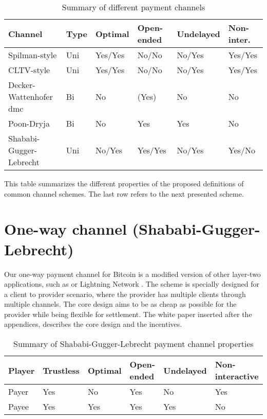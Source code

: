 \documentclass{llncs}
\begin{document}
\begin{table}[h]
  \begin{tabularx}{\textwidth}{ | X | l | l | l | l | l |}
  \hline
  Channel & Type & Optimal & Open-ended & Undelayed & Non-inter. \\
  \hline \hline
  Spilman-style & Uni & Yes/Yes & No/No & No/Yes & Yes/Yes \\ \hline
  CLTV-style & Uni & Yes/Yes & No/No & No/Yes & Yes/Yes \\ \hline
  Decker-Wattenhofer \gls{dmc} & Bi & No & (Yes) & No & No \\ \hline
  Poon-Dryja & Bi & No & Yes & Yes & No \\ \hline
  Shababi-Gugger-Lebrecht & Uni & No/Yes & Yes/Yes & No/Yes & Yes/No \\
  \hline
  \end{tabularx}
  \caption{Summary of different payment channels}
  \label{fig:summaryPaymentChannel}
\end{table}

This table summarizes the different properties of the proposed definitions of common channel schemes. The last row refers to the next presented scheme.

\section{One-way channel (Shababi-Gugger-Lebrecht)}

Our one-way payment channel for Bitcoin is a modified version of other layer-two applications, such as  or Lightning Network \cite{poon2016bitcoin, YoursLightningProtocol}. The scheme is specially designed for a client to provider scenario, where the provider has multiple clients through multiple channels. The core design aims to be as cheap as possible for the provider while being flexible for settlement. The white paper  inserted after the appendices, describes the core design and the incentives.

\begin{table}[h]
  \begin{tabularx}{\textwidth}{ | X | l | l | l | l | l |}
  \hline
  Player & Trustless & Optimal & Open-ended & Undelayed & Non-interactive \\
  \hline \hline
  Payer & Yes & No & Yes & No & Yes \\ \hline
  Payee & Yes & Yes & Yes & Yes & No \\
  \hline
  \end{tabularx}
  \caption{Summary of Shababi-Gugger-Lebrecht payment channel properties}
  \label{fig:summaryShababiGuggerLebrechtPaymentChannel}
\end{table}
\end{document}
